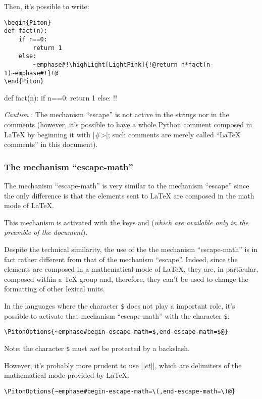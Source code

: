 \documentclass{article}
\begin{document}
\medskip
Then, it's possible to write:
\begin{Verbatim}
\begin{Piton}
def fact(n):
    if n==0:
        return 1
    else:
        ~emphase#!\highLight[LightPink]{!@return n*fact(n-1)~emphase#!}!@
\end{Piton}
\end{Verbatim}

   \begin{Piton}
def fact(n):
    if n==0:
        return 1
    else:
        !!
   \end{Piton}



\bigskip
\emph{Caution} : The mechanism ``escape'' is not active in the strings nor in
the comments (however, it's possible to have a whole Python comment
composed in LaTeX by beginning it with |#>|; such comments are merely called
``LaTeX comments'' in this document).


\subsubsection{The mechanism ``escape-math''}

The mechanism ``escape-math'' is very similar to the mechanism ``escape''
since the only difference is that the elements sent to LaTeX are composed in
the math mode of LaTeX.

This mechanism is activated with the keys  and
 (\emph{which are available only in the preamble of the
document}). 

Despite the technical similarity, the use of the the mechanism
``escape-math'' is in fact rather different from that of the mechanism
``escape''. Indeed, since the elements are composed in a mathematical mode
of LaTeX, they are, in particular, composed within a TeX group and, therefore,
they can't be used to change the formatting of other lexical units.

In the languages where the character \verb|$| does not play a important role,
it's possible to activate that mechanism ``escape-math'' with the character
\verb|$|:
\begin{Verbatim}
\PitonOptions{~emphase#begin-escape-math=$,end-escape-math=$@}
\end{Verbatim}
Note: the character \verb|$| must \emph{not} be protected by a backslash.

\bigskip
However, it's probably more prudent to use |\(| et |\)|, which are delimiters
of the mathematical mode provided by LaTeX.
\begin{Verbatim}
\PitonOptions{~emphase#begin-escape-math=\(,end-escape-math=\)@}
\end{Verbatim}
\end{document}

